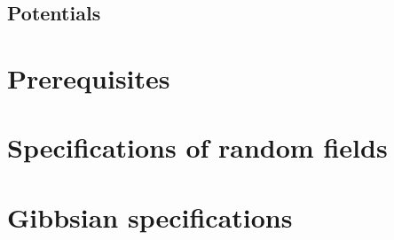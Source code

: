 

\section{Potentials}



\chapter{Prerequisites}



\chapter{Specifications of random fields}





\chapter{Gibbsian specifications}



